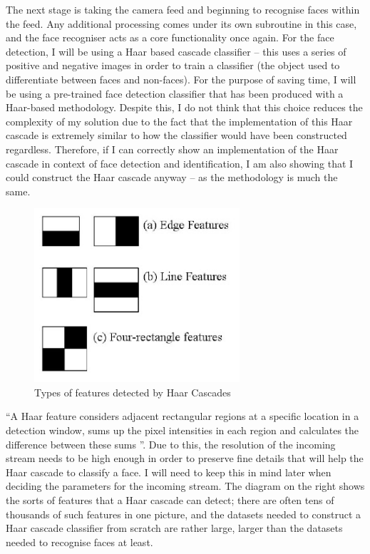 \documentclass[9pt]{article}
\begin{document}
The next stage is taking the camera feed and beginning to recognise faces within the feed. Any additional processing comes under its own subroutine in this case, and the face recogniser acts as a core functionality once again. For the face detection, I will be using a Haar based cascade classifier – this uses a series of positive and negative images in order to train a classifier (the object used to differentiate between faces and non-faces). For the purpose of saving time, I will be using a pre-trained face detection classifier that has been produced with a Haar-based methodology. Despite this, I do not think that this choice reduces the complexity of my solution due to the fact that the implementation of this Haar cascade is extremely similar to how the classifier would have been constructed regardless. Therefore, if I can correctly show an implementation of the Haar cascade in context of face detection and identification, I am also showing that I could construct the Haar cascade anyway – as the methodology is much the same.
\begin{figure}[H]
	\centering
	\includegraphics[width=3in]{haarCascades.png}
	\caption{Types of features detected by Haar Cascades \cite{haarImage}}\label{fig_haar}
\end{figure}
“A Haar feature considers adjacent rectangular regions at a specific location in a detection window, sums up the pixel intensities in each region and calculates the difference between these sums \cite{haarInformation}”. Due to this, the resolution of the incoming stream needs to be high enough in order to preserve fine details that will help the Haar cascade to classify a face. I will need to keep this in mind later when deciding the parameters for the incoming stream. The diagram on the right shows the sorts of features that a Haar cascade can detect; there are often tens of thousands of such features in one picture, and the datasets needed to construct a Haar cascade classifier from scratch are rather large, larger than the datasets needed to recognise faces at least.
\end{document}
